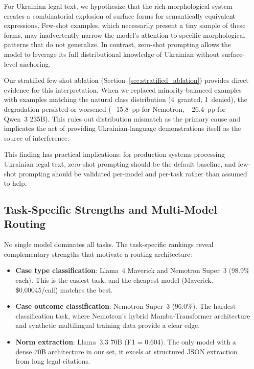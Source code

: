 \documentclass[11pt,a4paper]{article}
\begin{document}
For Ukrainian legal text, we hypothesize that the rich morphological system creates a combinatorial explosion of surface forms for semantically equivalent expressions. Few-shot examples, which necessarily present a tiny sample of these forms, may inadvertently narrow the model's attention to specific morphological patterns that do not generalize. In contrast, zero-shot prompting allows the model to leverage its full distributional knowledge of Ukrainian without surface-level anchoring.

Our stratified few-shot ablation (Section~\ref{sec:stratified_ablation}) provides direct evidence for this interpretation. When we replaced minority-balanced examples with examples matching the natural class distribution (4~granted, 1~denied), the degradation persisted or worsened ($-$15.8~pp for Nemotron, $-$26.4~pp for Qwen~3 235B). This rules out distribution mismatch as the primary cause and implicates the act of providing Ukrainian-language demonstrations itself as the source of interference.

This finding has practical implications: for production systems processing Ukrainian legal text, zero-shot prompting should be the default baseline, and few-shot prompting should be validated per-model and per-task rather than assumed to help.

\subsection{Task-Specific Strengths and Multi-Model Routing}
\label{sec:routing}

No single model dominates all tasks. The task-specific rankings reveal complementary strengths that motivate a routing architecture:

\begin{itemize}[leftmargin=*]
    \item \textbf{Case type classification}: Llama~4 Maverick and Nemotron Super~3 (98.9\% each). This is the easiest task, and the cheapest model (Maverick, \$0.00045/call) matches the best.
    \item \textbf{Case outcome classification}: Nemotron Super~3 (96.0\%). The hardest classification task, where Nemotron's hybrid Mamba-Transformer architecture and synthetic multilingual training data provide a clear edge.
    \item \textbf{Norm extraction}: Llama~3.3 70B (F1 = 0.604). The only model with a dense 70B architecture in our set, it excels at structured JSON extraction from long legal citations.
\end{itemize}
\end{document}
